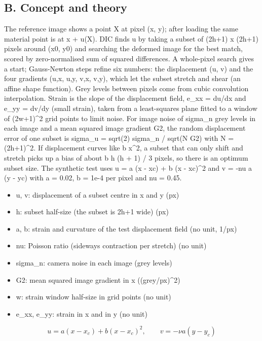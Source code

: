 \documentclass[11pt,a4paper]{article}
\begin{document}
\subsection*{B. Concept and theory}
The reference image shows a point X at pixel (x, y); after loading the same material point is at x + u(X). DIC finds u by taking a subset of (2h+1) x (2h+1) pixels around (x0, y0) and searching the deformed image for the best match, scored by zero-normalised sum of squared differences. A whole-pixel search gives a start; Gauss-Newton steps refine six numbers: the displacement (u, v) and the four gradients (u,x, u,y, v,x, v,y), which let the subset stretch and shear (an affine shape function). Grey levels between pixels come from cubic convolution interpolation. Strain is the slope of the displacement field, e\_xx = du/dx and e\_yy = dv/dy (small strain), taken from a least-squares plane fitted to a window of (2w+1)\textasciicircum{}2 grid points to limit noise. For image noise of sigma\_n grey levels in each image and a mean squared image gradient G2, the random displacement error of one subset is sigma\_u = sqrt(2) sigma\_n / sqrt(N G2) with N = (2h+1)\textasciicircum{}2. If displacement curves like b x\textasciicircum{}2, a subset that can only shift and stretch picks up a bias of about b h (h + 1) / 3 pixels, so there is an optimum subset size. The synthetic test uses u = a (x - xc) + b (x - xc)\textasciicircum{}2 and v = -nu a (y - yc) with a = 0.02, b = 1e-4 per pixel and nu = 0.45.

\begin{itemize}[nosep]
\item u, v: displacement of a subset centre in x and y (px)
\item h: subset half-size (the subset is 2h+1 wide) (px)
\item a, b: strain and curvature of the test displacement field (no unit, 1/px)
\item nu: Poisson ratio (sideways contraction per stretch) (no unit)
\item sigma\_n: camera noise in each image (grey levels)
\item G2: mean squared image gradient in x ((grey/px)\textasciicircum{}2)
\item w: strain window half-size in grid points (no unit)
\item e\_xx, e\_yy: strain in x and in y (no unit)
\end{itemize}

\begin{equation*}
u=a(x-x_c)+b(x-x_c)^2,\qquad v=-\nu a(y-y_c)
\end{equation*}
\end{document}
